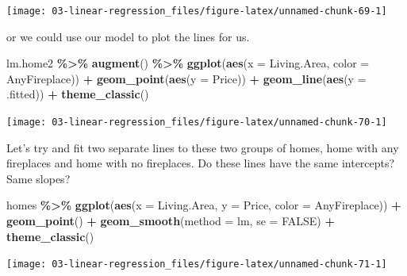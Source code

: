 \documentclass[
]{book}
\newenvironment{Shaded}{\begin{snugshade}}{\end{snugshade}}
\newcommand{\AttributeTok}[1]{\textcolor[rgb]{0.13,0.29,0.53}{#1}}
\newcommand{\ConstantTok}[1]{\textcolor[rgb]{0.56,0.35,0.01}{#1}}
\newcommand{\FunctionTok}[1]{\textcolor[rgb]{0.13,0.29,0.53}{\textbf{#1}}}
\newcommand{\NormalTok}[1]{#1}
\newcommand{\SpecialCharTok}[1]{\textcolor[rgb]{0.81,0.36,0.00}{\textbf{#1}}}
\newcommand{\StringTok}[1]{\textcolor[rgb]{0.31,0.60,0.02}{#1}}
\begin{document}
\begin{center}\texttt{[image: 03-linear-regression\_files/figure-latex/unnamed-chunk-69-1]} \end{center}

or we could use our model to plot the lines for us.

\begin{Shaded}
\begin{Highlighting}[]
\NormalTok{lm.home2 }\SpecialCharTok{\%\textgreater{}\%}
    \FunctionTok{augment}\NormalTok{() }\SpecialCharTok{\%\textgreater{}\%}
    \FunctionTok{ggplot}\NormalTok{(}\FunctionTok{aes}\NormalTok{(}\AttributeTok{x =}\NormalTok{ Living.Area, }\AttributeTok{color =}\NormalTok{ AnyFireplace)) }\SpecialCharTok{+} 
    \FunctionTok{geom\_point}\NormalTok{(}\FunctionTok{aes}\NormalTok{(}\AttributeTok{y =}\NormalTok{ Price)) }\SpecialCharTok{+}
    \FunctionTok{geom\_line}\NormalTok{(}\FunctionTok{aes}\NormalTok{(}\AttributeTok{y =}\NormalTok{ .fitted)) }\SpecialCharTok{+}
    \FunctionTok{theme\_classic}\NormalTok{()}
\end{Highlighting}
\end{Shaded}

\begin{center}\texttt{[image: 03-linear-regression\_files/figure-latex/unnamed-chunk-70-1]} \end{center}

Let's try and fit two separate lines to these two groups of homes, home with any fireplaces and home with no fireplaces. Do these lines have the same intercepts? Same slopes?

\begin{Shaded}
\begin{Highlighting}[]
\NormalTok{homes }\SpecialCharTok{\%\textgreater{}\%}
    \FunctionTok{ggplot}\NormalTok{(}\FunctionTok{aes}\NormalTok{(}\AttributeTok{x =}\NormalTok{ Living.Area, }\AttributeTok{y =}\NormalTok{ Price, }\AttributeTok{color =}\NormalTok{ AnyFireplace)) }\SpecialCharTok{+} 
    \FunctionTok{geom\_point}\NormalTok{() }\SpecialCharTok{+}
    \FunctionTok{geom\_smooth}\NormalTok{(}\AttributeTok{method =} \StringTok{\textquotesingle{}lm\textquotesingle{}}\NormalTok{, }\AttributeTok{se =} \ConstantTok{FALSE}\NormalTok{) }\SpecialCharTok{+}
    \FunctionTok{theme\_classic}\NormalTok{()}
\end{Highlighting}
\end{Shaded}

\begin{center}\texttt{[image: 03-linear-regression\_files/figure-latex/unnamed-chunk-71-1]} \end{center}
\end{document}

